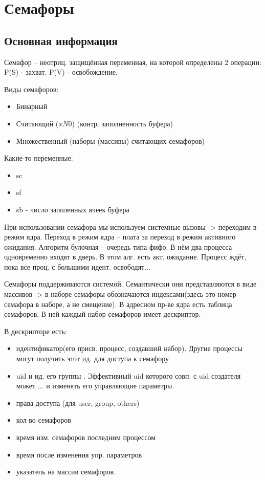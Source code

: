 \chapter{Семафоры}
\section{Основная информация}
Семафор -- неотриц. защищённая переменная, на которой определены 2 операции:
P(S) - захват.
P(V) - освобождение.

Виды семафоров:
\begin{itemize}
	\item Бинарный
	\item Считающий ($xN0$) (контр. заполненность буфера)
	\item Множественный (наборы (массивы) считающих семафоров)
\end{itemize}

Какие-то переменные:
\begin{itemize}
	\item sc
	\item sf
	\item sb - число заполенных ячеек буфера
\end{itemize}

При использовании семафора мы используем системные вызовы -> переходим в режим ядра.
Переход в режим ядра -- плата за переход в режим активного ожидания.
Алгоритм булочная -- очередь типа фифо. В нём два процесса одновременно входят в дверь. В этом алг. есть акт. ожидание.
Процесс ждёт, пока все проц.  с большими идент. освободят...

Семафоры поддерживаются системой. Семантически они представляются в виде массивов -> в наборе семафоры обозначаются индексами(здесь это номер семафора в наборе, а не смещение). В адресном пр-ве ядра есть таблица семафоров. В ней каждый набор семафоров имеет дескриптор.

В дескрипторе есть:
\begin{itemize}
	\item идентификатор(его присв. процесс, создавший набор). Другие процессы могут получить этот ид. для доступа к семафору
	\item uid и ид. его группы . Эффективный uid которого совп. с uid создателя может ... и изменять его управляющие параметры.
	\item права доступа (для user, group, others)
	\item кол-во семафоров 
	\item время изм. семафоров последним процессом
	\item время после изменения упр. параметров
	\item указатель на массив семафоров.
\end{itemize}

